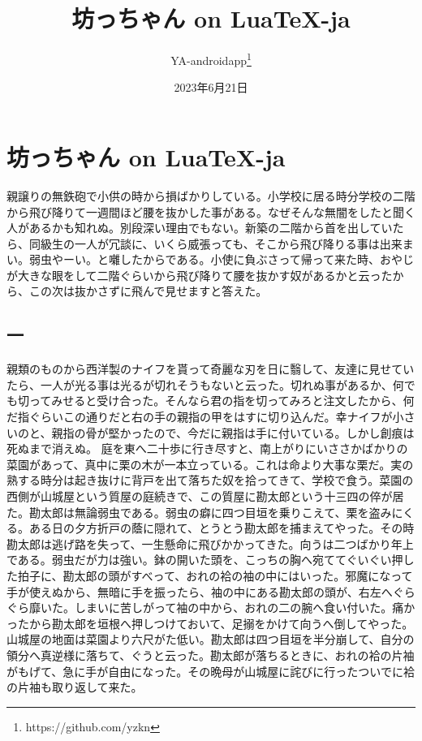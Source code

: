 \documentclass{ltjsarticle}
\title{坊っちゃん on Lua\TeX-ja}
\author{YA-androidapp\thanks{https://github.com/yzkn}}
\date{2023年6月21日}
\begin{document}
\maketitle

\section{坊っちゃん on Lua\TeX-ja}
親譲りの無鉄砲で小供の時から損ばかりしている。小学校に居る時分学校の二階から飛び降りて一週間ほど腰を抜かした事がある。なぜそんな無闇をしたと聞く人があるかも知れぬ。別段深い理由でもない。新築の二階から首を出していたら、同級生の一人が冗談に、いくら威張っても、そこから飛び降りる事は出来まい。弱虫やーい。と囃したからである。小使に負ぶさって帰って来た時、おやじが大きな眼をして二階ぐらいから飛び降りて腰を抜かす奴があるかと云ったから、この次は抜かさずに飛んで見せますと答えた。
\subsection{一}
親類のものから西洋製のナイフを貰って奇麗な刃を日に翳して、友達に見せていたら、一人が光る事は光るが切れそうもないと云った。切れぬ事があるか、何でも切ってみせると受け合った。そんなら君の指を切ってみろと注文したから、何だ指ぐらいこの通りだと右の手の親指の甲をはすに切り込んだ。幸ナイフが小さいのと、親指の骨が堅かったので、今だに親指は手に付いている。しかし創痕は死ぬまで消えぬ。
庭を東へ二十歩に行き尽すと、南上がりにいささかばかりの菜園があって、真中に栗の木が一本立っている。これは命より大事な栗だ。実の熟する時分は起き抜けに背戸を出て落ちた奴を拾ってきて、学校で食う。菜園の西側が山城屋という質屋の庭続きで、この質屋に勘太郎という十三四の倅が居た。勘太郎は無論弱虫である。弱虫の癖に四つ目垣を乗りこえて、栗を盗みにくる。ある日の夕方折戸の蔭に隠れて、とうとう勘太郎を捕まえてやった。その時勘太郎は逃げ路を失って、一生懸命に飛びかかってきた。向うは二つばかり年上である。弱虫だが力は強い。鉢の開いた頭を、こっちの胸へ宛ててぐいぐい押した拍子に、勘太郎の頭がすべって、おれの袷の袖の中にはいった。邪魔になって手が使えぬから、無暗に手を振ったら、袖の中にある勘太郎の頭が、右左へぐらぐら靡いた。しまいに苦しがって袖の中から、おれの二の腕へ食い付いた。痛かったから勘太郎を垣根へ押しつけておいて、足搦をかけて向うへ倒してやった。山城屋の地面は菜園より六尺がた低い。勘太郎は四つ目垣を半分崩して、自分の領分へ真逆様に落ちて、ぐうと云った。勘太郎が落ちるときに、おれの袷の片袖がもげて、急に手が自由になった。その晩母が山城屋に詫びに行ったついでに袷の片袖も取り返して来た。
\end{document}
